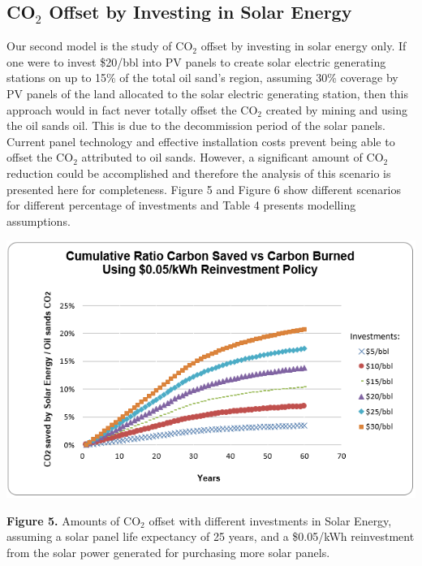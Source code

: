 \documentclass[11pt]{article}
\begin{document}
\subsection{CO$_2$ Offset by Investing in Solar Energy}

Our second model is the study of CO$_2$ offset by investing in solar energy only. If one were to invest \$20/bbl into PV panels to create solar electric generating stations on up to 15\% of the total oil sand's region, assuming 30\% coverage by PV panels of the land allocated to the solar electric generating station, then this approach would in fact never totally offset the CO$_2$ created by mining and using the oil sands oil. This is due to the decommission period of the solar panels. Current panel technology and effective installation costs prevent being able to offset the CO$_2$ attributed to oil sands. However, a significant amount of CO$_2$ reduction could be accomplished and therefore the analysis of this scenario is presented here for completeness.  Figure 5 and Figure 6 show different scenarios for different percentage of investments and Table 4 presents modelling assumptions.

\begin{center}
\includegraphics{g5.png}
\end{center}

\begin{center}
{\bf Figure 5.} Amounts of CO$_2$ offset with different investments in Solar Energy, assuming a solar panel life expectancy of 25 years, and a \$0.05/kWh reinvestment from the solar power generated for purchasing more solar panels.  
\end{center}
\end{document}
